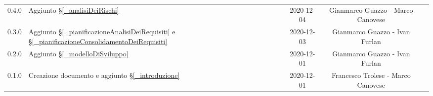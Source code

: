 \begin{center}
\begin{longtable}{|c|p{5cm}|c|c|c|}
		0.4.0 & Aggiunto \S\ref{_analisiDeiRischi} & 2020-12-04 & Gianmarco Guazzo - Marco Canovese \\
		0.3.0 & Aggiunto \S\ref{_pianificazioneAnalisiDeiRequisiti} e \S\ref{_pianificazioneConsolidamentoDeiRequisiti} & 2020-12-03 & Gianmarco Guazzo - Ivan Furlan \\
		0.2.0 & Aggiunto \S\ref{_modelloDiSviluppo} & 2020-12-01 & Gianmarco Guazzo - Ivan Furlan \\
		0.1.0 & Creazione documento e aggiunto \S\ref{_introduzione} & 2020-12-01 & Francesco Trolese - Marco Canovese \\
		\hline
	\end{longtable}
\end{center}